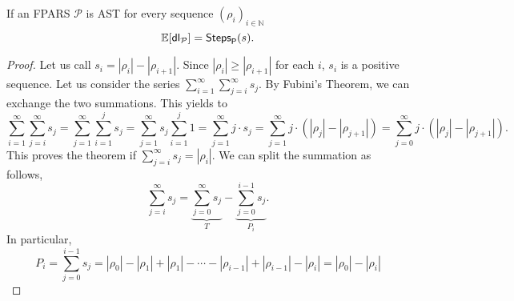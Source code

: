 \begin{LONG}
\begin{definition}
$$		$$
	\end{definition}
	\begin{proposition}
		If an FPARS $\mathcal{P}$ is AST for every sequence $(\rho_i)_{i\in\mathbb{N}}$
		$$
		\mathbb{E}[\mathsf{dl_\mathcal{P}}]=\mathsf{Steps}_{\mathsf{P}}(s).
		$$
	\end{proposition}
	\begin{proof}
		Let us call $s_i=\left|\rho_i\right| -\left|\rho_{i+1}\right|$. Since $\left|\rho_i\right|\geq\left|\rho_{i+1}\right|$ for each $i$, $s_i$ is a positive sequence. Let us consider the series $\sum\limits_{i=1}^{\infty} \sum\limits_{j=i}^{\infty} s_j$.
		By Fubini's Theorem, we can exchange the two summations. This yields to
		$$
		\sum\limits_{i=1}^{\infty} \sum\limits_{j=i}^{\infty} s_j = \sum\limits_{j=1}^{\infty} \sum\limits_{i=1}^{j} s_j = \sum\limits_{j=1}^{\infty} s_j\sum\limits_{i=1}^{j} 1= \sum\limits_{j=1}^{\infty} j\cdot s_j = \sum\limits_{j=1}^{\infty} j\cdot (\left|\rho_j\right| -\left|\rho_{j+1}\right|) = \sum\limits_{j=0}^{\infty} j\cdot (\left|\rho_j\right| -\left|\rho_{j+1}\right|).
		$$
		This proves the theorem if $\sum\limits_{j=i}^{\infty} s_j=\left|\rho_i\right|$. We can split the summation as follows,
		$$
		\sum\limits_{j=i}^{\infty} s_j = \underbrace{\sum\limits_{j=0}^{\infty} s_j}_T - \underbrace{\sum\limits_{j=0}^{i-1} s_j}_{P_i}.
		$$
		In particular,
		$$
		P_i = \sum\limits_{j=0}^{i-1} s_j = \left|\rho_0\right| -\left|\rho_{1}\right| + \left|\rho_{1}\right| - \cdots - \left|\rho_{i-1}\right| + \left|\rho_{i-1}\right| - \left|\rho_{i}\right|=\left|\rho_0\right| -\left|\rho_{i}\right|
$$
\end{proof}
\end{LONG}
